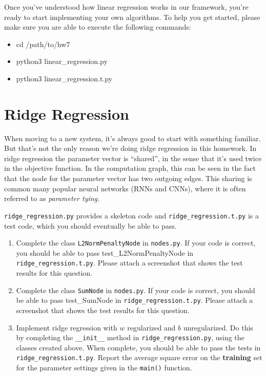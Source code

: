 \documentclass{article}
\theoremstyle{plain}
\theoremstyle{definition}
\begin{document}
Once you've understood how linear regression works in our framework,
you're ready to start implementing your own algorithms. To help you get started, please make sure you are able to execute the following commands:
\begin{itemize}
    \item cd /path/to/hw7
    \item python3 linear\_regression.py
    \item python3 linear\_regression.t.py
\end{itemize}

\section{Ridge Regression}

When moving to a new system, it's always good to start with something
familiar. But that's not the only reason we're doing ridge regression
in this homework. In ridge regression the
parameter vector is ``shared'', in the sense that it's used twice
in the objective function. In the computation graph, this can be seen
in the fact that the node for the parameter vector has two outgoing
edges. 
This sharing is common many popular neural networks (RNNs and CNNs), where it is often referred to as \emph{parameter tying}.

\texttt{ridge\_regression.py} provides a skeleton code
and \texttt{ridge\_regression.t.py} is a test code, which you should
eventually be able to pass.
\begin{enumerate}
\setcounter{enumi}{\value{saveenum}}
\item Complete the class \texttt{L2NormPenaltyNode} in \texttt{nodes.py}. If your code is correct, you should be able to pass test\_L2NormPenaltyNode in \texttt{ridge\_regression.t.py}. Please attach a screenshot that shows the test results for this question.
\item Complete the class \texttt{SumNode} in \texttt{nodes.py}. If your code is correct, you should be able to pass test\_SumNode in \texttt{ridge\_regression.t.py}. Please attach a screenshot that shows the test results for this question. 
\item Implement ridge regression with $w$ regularized and $b$ unregularized.
Do this by completing the \texttt{\_\_init\_\_} method in \texttt{ridge\_regression.py},
using the classes created above. When complete, you should be able
to pass the tests in \texttt{ridge\_regression.t.py}. Report the average
square error on the \textbf{training} set for the parameter settings
given in the \texttt{main()} function. 
\setcounter{saveenum}{\value{enumi}}
\end{enumerate}
\end{document}
